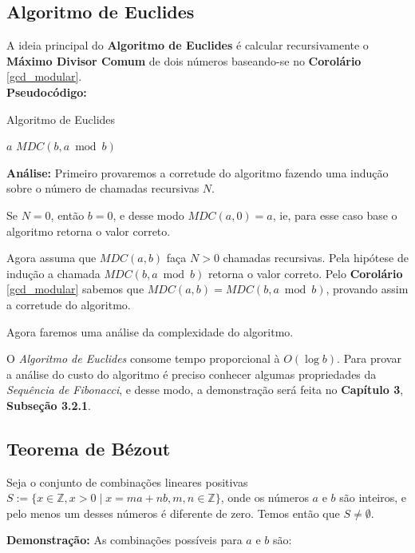 \subsection{Algoritmo de Euclides}\label{algoritmo_de_euclides_subsessao}
A ideia principal do \textbf{Algoritmo de Euclides} é calcular recursivamente o \textbf{Máximo Divisor Comum} de dois números baseando-se no 
\textbf{Corolário} \autoref{gcd_modular}.\\

\textbf{Pseudocódigo:}
\begin{algorithm}
\caption{Algoritmo de Euclides}\label{mdc}
\begin{algorithmic}[1]
\State \Return $a$
\EndIf
\State \Return $MDC(b, a \bmod b)$
\EndProcedure
\end{algorithmic}
\end{algorithm}

\textbf{Análise:}
Primeiro provaremos a corretude do algoritmo fazendo uma indução sobre o número de chamadas recursivas $N$.

Se $N=0$, então $b=0$, e desse modo $MDC(a,0)=a$, ie, para esse caso base o algoritmo retorna o valor correto.

Agora assuma que $MDC(a,b)$ faça $N>0$ chamadas recursivas. Pela hipótese de indução a chamada $MDC(b, a \bmod b)$ retorna o valor correto. Pelo \textbf{Corolário} \autoref{gcd_modular} sabemos que $MDC(a,b) = MDC(b, a \bmod b)$, provando assim a corretude do algoritmo.

Agora faremos uma análise da complexidade do algoritmo.

O \textit{Algoritmo de Euclides} consome tempo proporcional à $O(\log b)$. Para provar a análise do custo do algoritmo é preciso conhecer algumas propriedades da \textit{Sequência de Fibonacci}, e desse modo, a 
demonstração será feita no \textbf{Capítulo 3}, \textbf{Subseção 3.2.1}.



\subsection{Teorema de Bézout}

\begin{proposition}\label{bezout_conjunto_nao_nulo}
Seja o conjunto de combinações lineares positivas $S := \{x\in\mathbb{Z}, x>0 \mid x = ma + nb, m,n\in \mathbb{Z}\}$, onde os números $a$ e $b$ são inteiros, 
e pelo menos um desses números é diferente de zero. Temos então que $S \neq \emptyset$. 
\end{proposition}
\textbf{Demonstração:}
As combinações possíveis para $a$ e $b$ são:

